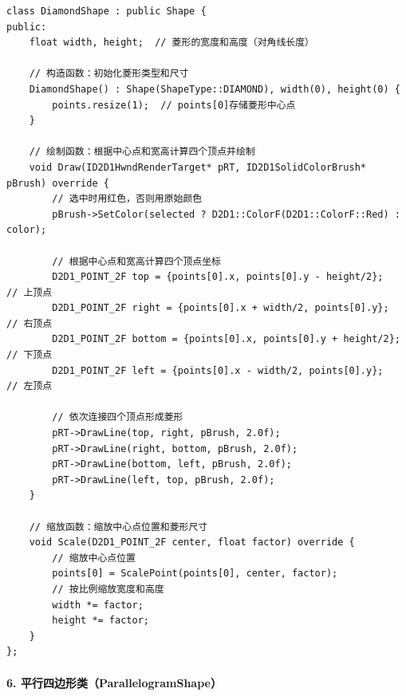\documentclass[12pt,a4paper]{article}
\begin{document}
\begin{lstlisting}[caption=DiamondShape类定义]
class DiamondShape : public Shape {
public:
    float width, height;  // 菱形的宽度和高度（对角线长度）
    
    // 构造函数：初始化菱形类型和尺寸
    DiamondShape() : Shape(ShapeType::DIAMOND), width(0), height(0) {
        points.resize(1);  // points[0]存储菱形中心点
    }
    
    // 绘制函数：根据中心点和宽高计算四个顶点并绘制
    void Draw(ID2D1HwndRenderTarget* pRT, ID2D1SolidColorBrush* pBrush) override {
        // 选中时用红色，否则用原始颜色
        pBrush->SetColor(selected ? D2D1::ColorF(D2D1::ColorF::Red) : color);
        
        // 根据中心点和宽高计算四个顶点坐标
        D2D1_POINT_2F top = {points[0].x, points[0].y - height/2};      // 上顶点
        D2D1_POINT_2F right = {points[0].x + width/2, points[0].y};     // 右顶点
        D2D1_POINT_2F bottom = {points[0].x, points[0].y + height/2};   // 下顶点
        D2D1_POINT_2F left = {points[0].x - width/2, points[0].y};      // 左顶点
        
        // 依次连接四个顶点形成菱形
        pRT->DrawLine(top, right, pBrush, 2.0f);
        pRT->DrawLine(right, bottom, pBrush, 2.0f);
        pRT->DrawLine(bottom, left, pBrush, 2.0f);
        pRT->DrawLine(left, top, pBrush, 2.0f);
    }
    
    // 缩放函数：缩放中心点位置和菱形尺寸
    void Scale(D2D1_POINT_2F center, float factor) override {
        // 缩放中心点位置
        points[0] = ScalePoint(points[0], center, factor);
        // 按比例缩放宽度和高度
        width *= factor;
        height *= factor;
    }
};
\end{lstlisting}

\paragraph{6. 平行四边形类（ParallelogramShape）}
\end{document}
